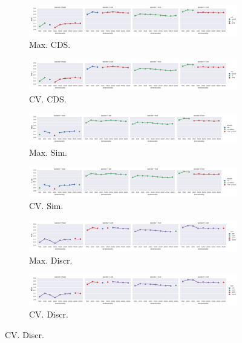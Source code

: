 \begin{landscape}
\begin{figure}
  \begin{subfigure}[t]{0.6\textwidth}
    \includegraphics[width=\textwidth]{supplement/figures/KS14-max_-selection-cds}
    \caption{Max. CDS.}
    \label{fig:}
  \end{subfigure}
  \begin{subfigure}[t]{0.6\textwidth}
    \includegraphics[width=\textwidth]{supplement/figures/KS14-cross_validation-selection-cds}
    \caption{CV. CDS.}
    \label{fig:}
  \end{subfigure}

  \begin{subfigure}[t]{0.6\textwidth}
    \includegraphics[width=\textwidth]{supplement/figures/KS14-max_-selection-similarity}
    \caption{Max. Sim.}
    \label{fig:}
  \end{subfigure}
  \begin{subfigure}[t]{0.6\textwidth}
    \includegraphics[width=\textwidth]{supplement/figures/KS14-cross_validation-selection-similarity}
    \caption{CV. Sim.}
    \label{fig:}
  \end{subfigure}

  \begin{subfigure}[t]{0.6\textwidth}
    \includegraphics[width=\textwidth]{supplement/figures/KS14-max_-selection-discr}
    \caption{Max. Discr.}
    \label{fig:}
  \end{subfigure}
  \begin{subfigure}[t]{0.6\textwidth}
    \includegraphics[width=\textwidth]{supplement/figures/KS14-cross_validation-selection-discr}
    \caption{CV. Discr.}
    \label{fig:}


\end{subfigure}
\end{figure}
\end{landscape}
